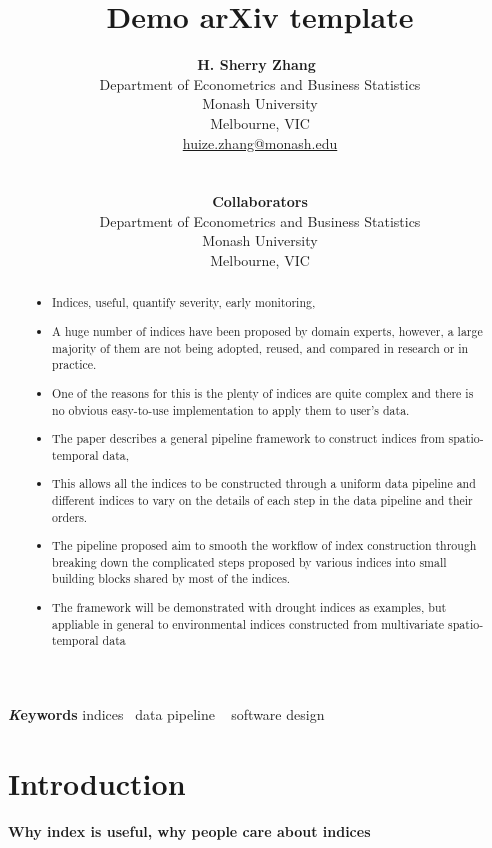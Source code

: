 \documentclass[
]{article}
\title{Demo arXiv template}
\author{
\textbf{H. Sherry Zhang}~\orcidlink{0000-0002-7122-1463}\\Department of
Econometrics and Business Statistics\\Monash University\\Melbourne,
VIC\\\href{mailto:huize.zhang@monash.edu}{huize.zhang@monash.edu}\\\\\\
\textbf{Collaborators}\\Department of Econometrics and Business
Statistics\\Monash University\\Melbourne, VIC\\}
\date{}
\providecommand{\tightlist}{%
  \setlength{\itemsep}{0pt}\setlength{\parskip}{0pt}}\usepackage{longtable,booktabs,array}
\begin{document}
\maketitle
\begin{abstract}
\begin{itemize}
\tightlist
\item
  Indices, useful, quantify severity, early monitoring,
\item
  A huge number of indices have been proposed by domain experts,
  however, a large majority of them are not being adopted, reused, and
  compared in research or in practice.
\item
  One of the reasons for this is the plenty of indices are quite complex
  and there is no obvious easy-to-use implementation to apply them to
  user's data.
\item
  The paper describes a general pipeline framework to construct indices
  from spatio-temporal data,
\item
  This allows all the indices to be constructed through a uniform data
  pipeline and different indices to vary on the details of each step in
  the data pipeline and their orders.
\item
  The pipeline proposed aim to smooth the workflow of index construction
  through breaking down the complicated steps proposed by various
  indices into small building blocks shared by most of the indices.
\item
  The framework will be demonstrated with drought indices as examples,
  but appliable in general to environmental indices constructed from
  multivariate spatio-temporal data
\end{itemize}
\end{abstract}
{\bfseries \emph Keywords}
\def\sep{\textbullet\ }
indices \sep data pipeline \sep 
software design

\ifdefined\Shaded\renewenvironment{Shaded}{\begin{tcolorbox}[breakable, interior hidden, frame hidden, boxrule=0pt, sharp corners, enhanced, borderline west={3pt}{0pt}{shadecolor}]}{\end{tcolorbox}}\fi

\newpage

\hypertarget{introduction}{%
\section{Introduction}\label{introduction}}

\textbf{Why index is useful, why people care about indices}
\end{document}
